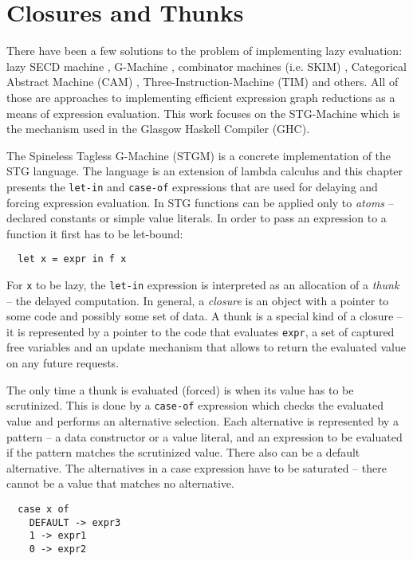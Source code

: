 \documentclass[en]{pracamgr}
\begin{document}
\section{Closures and Thunks}

There have been a few solutions to the problem of implementing lazy evaluation:
lazy SECD machine \cite{SECDM}, G-Machine \cite{G-Machine}, 
combinator machines (i.e. SKIM) \cite{combinators},
Categorical Abstract Machine (CAM) \cite{CAM}, 
Three-Instruction-Machine (TIM) \cite{TIM} and others.
All of those are approaches to implementing efficient expression graph reductions
as a means of expression evaluation.
This work focuses on the STG-Machine \cite{STGM} which is the mechanism used
in the Glasgow Haskell Compiler (GHC).

The Spineless Tagless G-Machine (STGM) is a concrete implementation of the STG language.
The language is an extension of lambda calculus and this chapter presents
the \texttt{let-in} and \texttt{case-of} expressions that are
used for delaying and forcing expression evaluation.
In STG functions can be applied only to \textit{atoms} -- declared constants or simple
value literals. In order to pass an expression to a function it first has to be
let-bound:

\begin{verbatim}
  let x = expr in f x
\end{verbatim}

For \texttt{x} to be lazy, the \texttt{let-in} expression is interpreted as an
allocation of a \textit{thunk} -- the delayed computation. 
In general, a \textit{closure} is an object with a pointer
to some code and possibly some set of data.
A thunk is a special kind of a closure -- it is represented
by a pointer to the code that evaluates \texttt{expr}, a set of captured
free variables and an update mechanism that allows to return the
evaluated value on any future requests.

The only time a thunk is evaluated (forced) is when its value has to be scrutinized.
This is done by a \texttt{case-of} expression which checks the evaluated value
and performs an alternative selection. Each alternative is represented by a
pattern -- a data constructor or a value literal, and an expression to be evaluated
if the pattern matches the scrutinized value. There also can be a default alternative.
The alternatives in a case expression have to be saturated -- there cannot be a value
that matches no alternative.

\begin{verbatim}
  case x of
    DEFAULT -> expr3
    1 -> expr1
    0 -> expr2
\end{verbatim}
\end{document}
